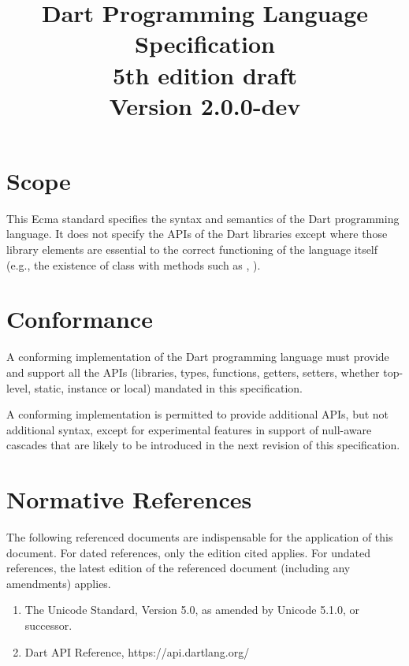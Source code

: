 \documentclass{article}
\title{Dart Programming Language Specification  \\
{5th edition draft}\\
{\large Version 2.0.0-dev}}
\begin{document}
\maketitle
\tableofcontents


\newpage

\pagestyle{myheadings}

\section{Scope}

\LMHash{}
This Ecma standard specifies the syntax and semantics of the Dart programming language.  It does not specify the APIs of the Dart libraries except where those library elements are essential to the correct functioning of the language itself (e.g., the existence of class  with methods such as , ).

\section{Conformance}

\LMHash{}
A conforming  implementation of the Dart programming language must provide and support all the  APIs (libraries, types, functions, getters, setters, whether top-level, static, instance or local) mandated in this specification.

\LMHash{}
A conforming implementation is permitted to provide additional APIs, but not additional syntax, except for experimental features in support of null-aware cascades that are likely to be introduced in the next revision of this specification.

\section{Normative References}

\LMHash{}
The following referenced documents are indispensable for the application of this document. For dated references, only the edition cited applies. For undated references, the latest edition of the referenced document (including any amendments) applies.

\begin{enumerate}
\item
The Unicode Standard, Version 5.0, as amended by Unicode 5.1.0, or successor.
\item
Dart API Reference, https://api.dartlang.org/
\end{enumerate}
\end{document}
